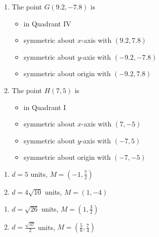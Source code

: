 \documentclass{ximera}
\begin{document}
\begin{enumerate}
\begin{multicols}{2}
\begin{enumerate}
\item The point $G(9.2, -7.8)$ is 

\begin{itemize}

\item in Quadrant IV
\item symmetric about $x$-axis with $(9.2, 7.8)$
\item symmetric about $y$-axis with {\scriptsize $(-9.2, -7.8)$}
\item symmetric about origin with $(-9.2, 7.8)$

\end{itemize}

\item The point $H(7, 5)$ is 

\begin{itemize}

\item in Quadrant I
\item symmetric about $x$-axis with $(7, -5)$
\item symmetric about $y$-axis with $(-7, 5)$
\item symmetric about origin with $(-7, -5)$

\end{itemize}

\end{enumerate}
\end{multicols}
\setcounter{HW}{\value{enumi}}
\end{enumerate}


\begin{multicols}{2}
\begin{enumerate}
\setcounter{enumi}{\value{HW}}

\item $d = 5$ units, $M = \left(-1, \frac{7}{2} \right)$
\item $d = 4 \sqrt{10}$ units, $M = \left(1, -4 \right)$

\setcounter{HW}{\value{enumi}}
\end{enumerate}
\end{multicols}

\begin{multicols}{2}
\begin{enumerate}
\setcounter{enumi}{\value{HW}}

\item $d = \sqrt{26}$ units, $M = \left(1, \frac{3}{2} \right)$
\item $d= \frac{\sqrt{37}}{2}$ units, $M = \left(\frac{5}{6}, \frac{7}{4} \right)$

\setcounter{HW}{\value{enumi}}
\end{enumerate}
\end{multicols}
\end{document}
